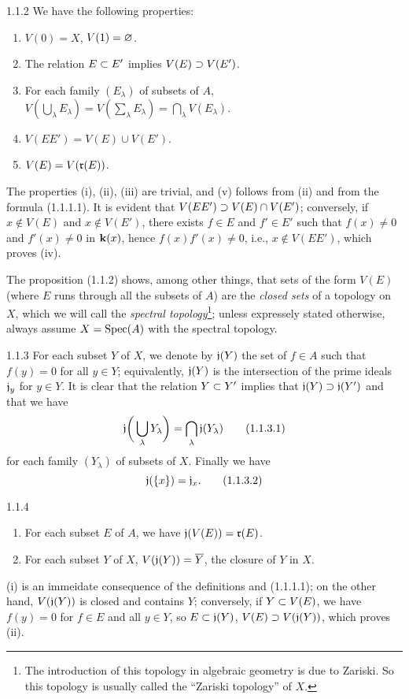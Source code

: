 \documentclass[../main.tex]{subfiles}
\begin{document}
\begin{cx}[Proposition]{1.1.2}
We have the following properties:
\begin{enumerate}[label=(\roman*)]
  \item $V(0)=X$, $V(1)=\varnothing$.
  \item The relation $E\subset E'$ implies $V(E)\supset V(E')$.
  \item For each family $(E_\lambda)$ of subsets of $A$,
  $V(\bigcup_\lambda E_\lambda)=V(\sum_\lambda E_\lambda)=\bigcap_\lambda V(E_\lambda)$.
  \item $V(EE')=V(E)\cup V(E')$.
  \item $V(E)=V(\mathfrak{r}(E))$.
\end{enumerate}
\end{cx}
The properties (i), (ii), (iii) are trivial, and (v) follows from (ii) and from the
formula (1.1.1.1). It is evident that $V(EE')\supset V(E)\cap V(E')$; conversely, if
$x\not\in V(E)$ and $x\not\in V(E')$, there exists $f\in E$ and $f'\in E'$ such that
$f(x)\neq 0$ and $f'(x)\neq 0$ in $\mathbf{k}(x)$, hence $f(x)f'(x)\neq 0$, i.e., $x\not\in V(EE')$,
which proves (iv).

The proposition (1.1.2) shows, among other things, that sets of the form $V(E)$ (where
$E$ runs through all the subsets of $A$) are the \emph{closed sets} of a topology on
$X$, which we will call the \emph{spectral topology}\footnote{The introduction of this
topology in algebraic geometry is due to Zariski. So this topology is usually called
the ``Zariski topology'' of $X$.}; unless expressely stated otherwise, always assume
$X=\operatorname{Spec}(A)$ with the spectral topology.

\begin{cx}{1.1.3}
For each subset $Y$ of $X$, we denote by $\mathfrak{j}(Y)$ the set of $f\in A$
such that $f(y)=0$ for all $y\in Y$; equivalently, $\mathfrak{j}(Y)$ is the intersection of
the prime ideals $\mathfrak{j}_y$ for $y\in Y$. It is clear that the relation $Y\subset Y'$
implies that $\mathfrak{j}(Y)\supset\mathfrak{j}(Y')$ and that we have
\begin{equation}
  \mathfrak{j}\bigg(\bigcup_\lambda Y_\lambda\bigg)=\bigcap_\lambda\mathfrak{j}(Y_\lambda)\tag{1.1.3.1}
\end{equation}
for each family $(Y_\lambda)$ of subsets of $X$. Finally we have
\begin{equation}
  \mathfrak{j}(\{x\})=\mathfrak{j}_x.\tag{1.1.3.2}
\end{equation}
\end{cx}

\begin{cx}[Proposition]{1.1.4}
\begin{enumerate}[label=(\roman*)]
  \item For each subset $E$ of $A$, we have $\mathfrak{j}(V(E))=\mathfrak{r}(E)$.
  \item For each subset $Y$ of $X$, $V(\mathfrak{j}(Y))=\overline{Y}$, the closure of $Y$ in $X$.
\end{enumerate}
\end{cx}
(i) is an immeidate consequence of the definitions and (1.1.1.1); on the other hand, $V(\mathfrak{j}(Y))$
is closed and contains $Y$; conversely, if $Y\subset V(E)$, we have $f(y)=0$ for $f\in E$ and all $y\in Y$,
so $E\subset\mathfrak{j}(Y)$, $V(E)\supset V(\mathfrak{j}(Y))$, which proves (ii).
\end{document}
